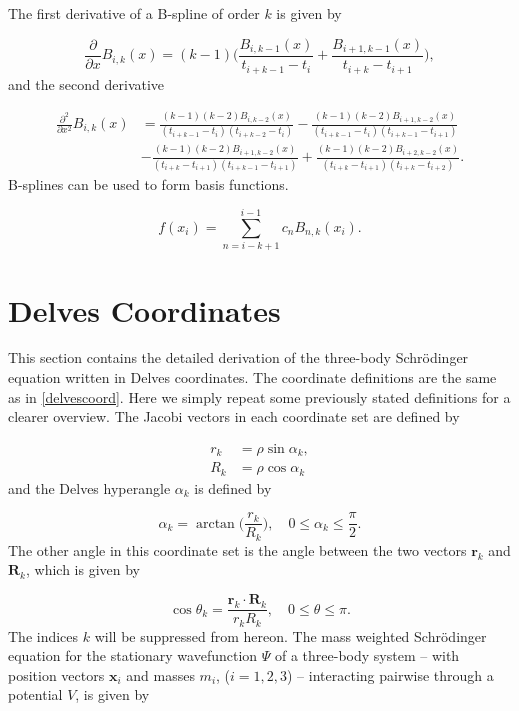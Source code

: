 \documentclass{article}
\numberwithin{equation}{section}
\numberwithin{figure}{section}
\begin{document}
The first derivative of a B-spline of order $k$ is given by

\begin{equation}
\frac{\partial}{\partial x}B_{i,k}(x) = (k-1)\bigg(\frac{B_{i,k-1}(x)}{t_{i+k-1}-t_i} + \frac{B_{i+1,k-1}(x)}{t_{i+k}-t_{i+1}}\bigg),
\end{equation}
and the second derivative

\begin{align}
\frac{\partial^2}{\partial x^2}B_{i,k}(x) &= \frac{(k-1)(k-2)B_{i,k-2}(x)}{(t_{i+k-1}-t_i)(t_{i+k-2}-t_i)} - \frac{(k-1)(k-2)B_{i+1,k-2}(x)}{(t_{i+k-1}-t_i)(t_{i+k-1}-t_{i+1})}\nonumber\\
&- \frac{(k-1)(k-2)B_{i+1,k-2}(x)}{(t_{i+k}-t_{i+1})(t_{i+k-1}-t_{i+1})} +  \frac{(k-1)(k-2)B_{i+2,k-2}(x)}{(t_{i+k}-t_{i+1})(t_{i+k}-t_{i+2})}.
\end{align}
B-splines can be used to form basis functions. 

\begin{equation}
f(x_i) = \sum_{n=i-k+1}^{i-1} c_n B_{n,k}(x_i).
\end{equation}

\section{Delves Coordinates}\label{delves}
This section contains the detailed derivation of the three-body Schr{\"o}dinger equation written in Delves coordinates. The coordinate definitions are the same as in \cref{delvescoord}. Here we simply repeat some previously stated definitions for a clearer overview. The Jacobi vectors in each coordinate set are defined by

\begin{subequations}
	\begin{align}
	r_{k} &= \rho \sin{\alpha_{k}},\\
	R_{k} &= \rho \cos{\alpha_{k}}
	\end{align}
\end{subequations}
and the Delves hyperangle $\alpha_{k}$ is defined by

\begin{equation}
\alpha_{k} = \arctan\bigg(\frac{r_{k}}{R_{k}}\bigg), \quad 0\leq \alpha_{k} \leq \frac{\pi}{2}.
\end{equation}
The other angle in this coordinate set is the angle between the two vectors $\mathbf{r}_{k}$ and $\mathbf{R}_{k}$, which is given by

\begin{equation}
\cos{\theta_{k}} = \frac{\mathbf{r}_{k} \cdot \mathbf{R}_{k}}{r_{k} R_{k}}, \quad  0\leq \theta \leq \pi.
\end{equation}
The indices $k$ will be suppressed from hereon. The mass weighted Schr{\"o}dinger equation for the stationary wavefunction $\Psi$ of a three-body system -- with position vectors $\mathbf{x}_i$ and masses $m_i$, ($i=1,2,3$) -- interacting pairwise through a potential $V$, is given by
\end{document}
